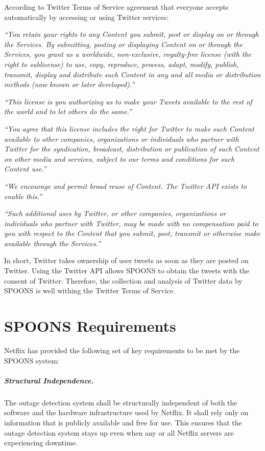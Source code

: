 \documentclass[12pt]{ucthesis}
\begin{document}
According to Twitter Terms of Service \cite{termsOfService} agreement that
everyone accepts automatically by accessing or using Twitter services:

\emph{``You retain your rights to any Content you submit, post or
display on or through the Services. By submitting, posting or displaying Content
on or through the Services, you grant us a worldwide, non-exclusive,
royalty-free license (with the right to sublicense) to use, copy, reproduce,
process, adapt, modify, publish, transmit, display and distribute such Content
in any and all media or distribution methods (now known or later developed).''}

\emph{``This license is you authorizing us to make your Tweets available to the
rest of the world and to let others do the same.''}

\emph{``You agree that this license includes the right for Twitter to make such
Content available to other companies, organizations or individuals who partner with
Twitter for the syndication, broadcast, distribution or publication of such
Content on other media and services, subject to our terms and conditions for
such Content use.''}

\emph{``We encourage and permit broad reuse of Content. The Twitter API exists to
enable this.''}

\emph{``Such additional uses by Twitter, or other companies, organizations or
individuals who partner with Twitter, may be made with no compensation paid to
you with respect to the Content that you submit, post, transmit or otherwise
make available through the Services.''}

In short, Twitter takes ownership of user tweets as soon as they are posted on Twitter.
Using the Twitter API allows SPOONS to obtain the tweets with the consent of Twitter.
Therefore, the collection and analysis of Twitter data by SPOONS is well withing the
Twitter Terms of Service.

\chapter{SPOONS Requirements}
\label{requirements}
Netflix has provided the following set of key requirements to be met by the
SPOONS system:

\paragraph{Structural Independence.}
The outage detection system shall be structurally independent of both the
software and the hardware infrastructure used by Netflix. It shall rely only on
information that is publicly available and free for use. This ensures that the
outage detection system stays up even when any or all Netflix servers are
experiencing downtime.
\end{document}

